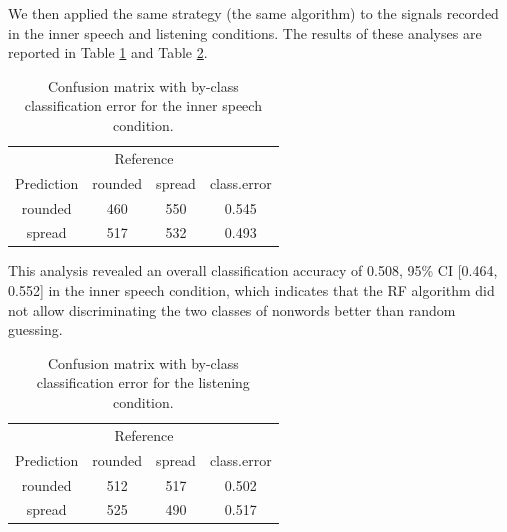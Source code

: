 \documentclass[a4paper,12pt,twoside,openright,oldfontcommands]{memoir}
\begin{document}
We then applied the same strategy (the same algorithm) to the signals recorded in the inner speech and listening conditions. The results of these analyses are reported in Table \ref{tab:CMinner} and Table \ref{tab:CMlistening}.

\begin{table}[H]
\begin{center}
\begin{threeparttable}
\caption{\label{tab:CMinner}Confusion matrix with by-class classification error for the inner speech condition.}
\begin{tabular}{cccc}
\toprule
 & \multicolumn{2}{c}{Reference}  &\\
\cmidrule(r){2-3}
Prediction & \multicolumn{1}{c}{rounded} & \multicolumn{1}{c}{spread} & \multicolumn{1}{c}{class.error}\\
\midrule
rounded & 460 & 550 & 0.545\\
spread & 517 & 532 & 0.493\\
\bottomrule
\end{tabular}
\end{threeparttable}
\end{center}
\end{table}

This analysis revealed an overall classification accuracy of 0.508, 95\% CI {[}0.464, 0.552{]} in the inner speech condition, which indicates that the RF algorithm did not allow discriminating the two classes of nonwords better than random guessing.

\begin{table}[H]
\begin{center}
\begin{threeparttable}
\caption{\label{tab:CMlistening}Confusion matrix with by-class classification error for the listening condition.}
\begin{tabular}{cccc}
\toprule
 & \multicolumn{2}{c}{Reference}  &\\
\cmidrule(r){2-3}
Prediction & \multicolumn{1}{c}{rounded} & \multicolumn{1}{c}{spread} & \multicolumn{1}{c}{class.error}\\
\midrule
rounded & 512 & 517 & 0.502\\
spread & 525 & 490 & 0.517\\
\bottomrule
\end{tabular}
\end{threeparttable}
\end{center}
\end{table}
\end{document}
